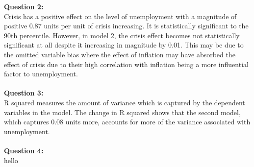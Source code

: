 \documentclass[12pt, letterpaper]{article}
\begin{document}
\textbf{Question 2:}\\
Crisis has a positive effect on the level of unemployment with a magnitude of positive 0.87 units per unit of crisis increasing. It is statistically significant to the 90th percentile. However, in model 2, the crisis effect becomes not statistically significant at all despite it increasing in magnitude by 0.01. This may be due to the omitted variable bias where the effect of inflation may have absorbed the effect of crisis due to their high correlation with inflation being a more influential factor to unemployment.\\\\
\textbf{Question 3:}\\
R squared measures the amount of variance which is captured by the dependent variables in the model. The change in R squared shows that the second model, which captures 0.08 units more, accounts for more of the variance associated with unemployment. \\\\
\textbf{Question 4:}\\
hello
\\\\
\begin{center}

\noindent{}


\end{center}
\end{document}
